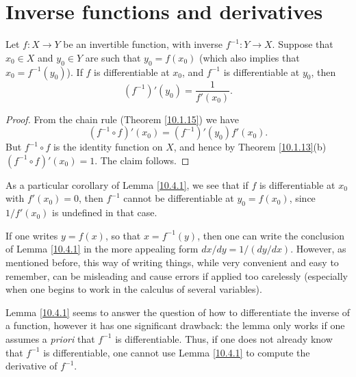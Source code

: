 \section{Inverse functions and derivatives}\label{sec 10.4}

\begin{lemma}\label{10.4.1}
    Let \(f : X \to Y\) be an invertible function, with inverse \(f^{-1} : Y \to X\).
    Suppose that \(x_0 \in X\) and \(y_0 \in Y\) are such that \(y_0 = f(x_0)\)
    (which also implies that \(x_0 = f^{-1}(y_0)\)).
    If \(f\) is differentiable at \(x_0\), and \(f^{-1}\) is differentiable at \(y_0\), then
    \[
        (f^{-1})'(y_0) = \frac{1}{f'(x_0)}.
    \]
\end{lemma}

\begin{proof}
    From the chain rule (Theorem \ref{10.1.15}) we have
    \[
        (f^{-1} \circ f)'(x_0) = (f^{-1})'(y_0) f'(x_0).
    \]
    But \(f^{-1} \circ f\) is the identity function on \(X\), and hence by Theorem \ref{10.1.13}(b) \((f^{-1} \circ f)'(x_0) = 1\).
    The claim follows.
\end{proof}

\begin{note}
    As a particular corollary of Lemma \ref{10.4.1}, we see that if \(f\) is differentiable at \(x_0\) with \(f'(x_0) = 0\), then \(f^{-1}\) cannot be differentiable at \(y_0 = f(x_0)\), since \(1 / f'(x_0)\) is undefined in that case.
\end{note}

\begin{note}
    If one writes \(y = f(x)\), so that \(x = f^{-1}(y)\), then one can write the conclusion of Lemma \ref{10.4.1} in the more appealing form \(dx / dy = 1 / (dy / dx)\).
    However, as mentioned before, this way of writing things, while very convenient and easy to remember, can be misleading and cause errors if applied too carelessly (especially when one begins to work in the calculus of several variables).
\end{note}

\begin{note}
    Lemma \ref{10.4.1} seems to answer the question of how to differentiate the inverse of a function, however it has one significant drawback:
    the lemma only works if one assumes a \emph{priori} that \(f^{-1}\) is differentiable.
    Thus, if one does not already know that \(f^{-1}\) is differentiable, one cannot use Lemma \ref{10.4.1} to compute the derivative of \(f^{-1}\).
\end{note}

